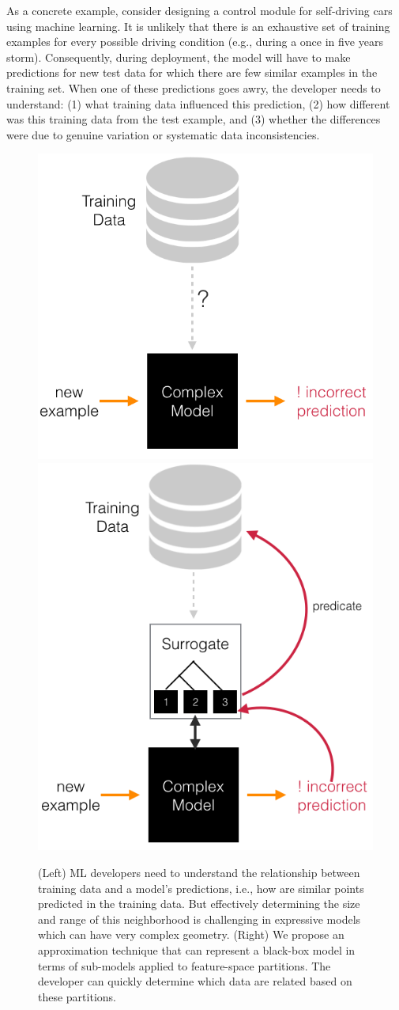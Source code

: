 As a concrete example, consider designing a control module for self-driving cars using machine learning.
It is unlikely that there is an exhaustive set of training examples for every possible driving condition (e.g., during a once in five years storm).
Consequently, during deployment, the model will have to make predictions for new test data for which there are few similar examples in the training set.
When one of these predictions goes awry, the developer needs to understand: (1) what training data influenced this prediction, (2) how different was this training data from the test example, and (3) whether the differences were due to genuine variation or systematic data inconsistencies.  

\begin{figure}
    \centering
    \includegraphics[width=0.48\columnwidth]{figures/teaser1.png}
    \includegraphics[width=0.48\columnwidth]{figures/teaser2.png}
    \caption{(Left) ML developers need to understand the relationship between training data and a model's predictions, i.e., how are similar points predicted in the training data. But effectively determining the size and range of this neighborhood is challenging in expressive models which can have very complex geometry. (Right) We propose an approximation technique that can represent a black-box model in terms of sub-models applied to feature-space partitions. The developer can quickly determine which data are related based on these partitions.}
    \label{fig:my_label}
\end{figure}


